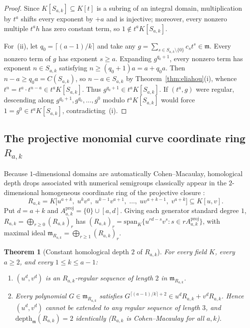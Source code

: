 \documentclass[11pt]{amsart}
\newtheorem{theorem}{Theorem}[section]
\theoremstyle{definition}
\theoremstyle{remark}
\newcommand{\mm}{\mathfrak{m}}
\newcommand{\depth}{\mathrm{depth}}
\begin{document}
\begin{proof}
Since $K[S_{a,k}] \subseteq K[t]$ is a subring of an integral domain, multiplication by $t^a$ shifts every exponent by $+a$ and is injective; moreover, every nonzero multiple $t^a h$ has zero constant term, so $1 \notin t^a K[S_{a,k}]$.

For~(ii), let $q_0 = \lceil (a-1)/k \rceil$ and take any $g = \sum_{s \in S_{a,k} \setminus \{0\}} c_s t^s \in \mm$. Every nonzero term of $g$ has exponent $s \ge a$. Expanding $g^{q_0 + 1}$, every nonzero term has exponent $n \in S_{a,k}$ satisfying $n \ge (q_0 + 1)a = a + q_0 a$. Then $n - a \ge q_0 a = C(S_{a,k})$, so $n - a \in S_{a,k}$ by Theorem~\ref{thm:eliahou}(i), whence $t^n = t^a \cdot t^{n-a} \in t^a K[S_{a,k}]$. Thus $g^{q_0 + 1} \in t^a K[S_{a,k}]$. If $(t^a, g)$ were regular, descending along $g^{q_0+1}, g^{q_0}, \dots, g^0$ modulo $t^a K[S_{a,k}]$ would force $1 = g^0 \in t^a K[S_{a,k}]$, contradicting~(i).
\end{proof}

\subsection{The projective monomial curve coordinate ring \texorpdfstring{$R_{a,k}$}{R\_\{a,k\}}}
Because $1$-dimensional domains are automatically Cohen--Macaulay, homological depth drops associated with numerical semigroups classically appear in the $2$-dimensional homogeneous coordinate ring of the projective closure \cite{Bresinsky1975,GotoWatanabe1978,PatilSingh1990}:
\[
  R_{a,k} = K\bigl[u^{a+k},\; u^k v^a,\; u^{k-1} v^{a+1},\; \dots,\; u v^{a+k-1},\; v^{a+k}\bigr] \subseteq K[u,v].
\]
Put $d = a + k$ and $A^{\mathrm{proj}}_{a,k} = \{0\} \cup [a, d]$. Giving each generator standard degree $1$, $R_{a,k} = \bigoplus_{r \ge 0} (R_{a,k})_r$ has $(R_{a,k})_r = \mathrm{span}_K\{u^{rd - s} v^s : s \in r A^{\mathrm{proj}}_{a,k}\}$, with maximal ideal $\mm_{R_{a,k}} = \bigoplus_{r \ge 1} (R_{a,k})_r$.

\begin{theorem}[{Constant homological depth $2$ of $R_{a,k}$}]
\label{thm:proj-depth}
For every field $K$, every $a \ge 2$, and every $1 \le k \le a-1$:
\begin{enumerate}
  \item[(i)] $(u^d, v^d)$ is an $R_{a,k}$-regular sequence of length $2$ in $\mm_{R_{a,k}}$.
  \item[(ii)] Every polynomial $G \in \mm_{R_{a,k}}$ satisfies $G^{\lceil (a-1)/k \rceil + 2} \in u^d R_{a,k} + v^d R_{a,k}$. Hence $(u^d, v^d)$ cannot be extended to any regular sequence of length $3$, and $\depth_{\mm}(R_{a,k}) = 2$ identically ($R_{a,k}$ is Cohen--Macaulay for all $a,k$).
\end{enumerate}
\end{theorem}
\end{document}

